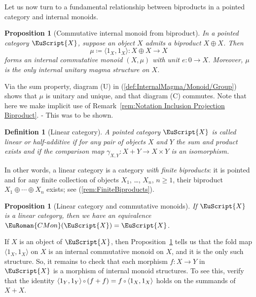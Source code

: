 \documentclass [12pt,oneside]{book}%
\makeatletter
\theoremstyle{captionstyle}  %
\newtheorem{definition}[theorem]{Definition}
\newtheorem{proposition}[theorem]{Proposition}
\renewenvironment{proof}[1][\proofname]{\vspace{-2ex}\par       %
	\pushQED{\qed}%
	\normalfont \topsep6\p@\@plus6\p@\relax
	\trivlist
	\item[\hskip\labelsep
	            \color{proofcaption}\bfseries                %
	            #1\@addpunct{\quad}]\ignorespaces
}{%
	\popQED\endtrivlist\@endpefalse
}
\newcommand{\Defn}[1]{\emph{#1}}
\newcommand{\DefEq}{\coloneq} 		%
\newcommand{\from}{\colon}				%
\newcommand{\Comp}{\raisebox{0.1ex}{\ensuremath{\,\scriptstyle{\circ}}\,}}
\newcommand{\IdMapOn}[1]{1_{#1}}	%
\newcommand{\CMon}{\ensuremath{\EuRoman{CMon}}}
\newcommand{\ZeroObject}{0}                           %
\newcommand{\Ctgry}[1]{\EuScript{#1}}					%
\newcommand{\SACtgry}[1]{\EuScript{#1}}			%
\newcommand{\Prdct}[2]{#1 \times #2}	 	%
\newcommand{\BiPrdct}[2]{#1\oplus #2}
\newcommand{\SumMapOutOf}[1]{\langle #1\rangle}     %
\newcommand{\SumProdComp}[2]{\gamma_{#1,#2}}			%
\makeatother
\begin{document}
Let us now turn to a fundamental relationship between biproducts in a pointed category and internal monoids.

\begin{proposition}[Commutative internal monoid from biproduct]
    \label{thm:CommutativeInternalMonoid-From-BiProduct}
    In a pointed category $\Ctgry{X}$, suppose an object $X$ admits a biproduct $X\oplus X$. Then
    \[
        \mu\DefEq \SumMapOutOf{\IdMapOn{X},\IdMapOn{X}}\from \BiPrdct{X}{X}\to X
    \]
    forms an internal commutative monoid $(X,\mu)$ with unit $e \from \ZeroObject\to X$. Moreover, $\mu$ is the only internal unitary magma structure on $X$.
\end{proposition}
\begin{proof}
    Via the sum property, diagram (U) in (\ref{def:InternalMagma/Monoid/Group}) shows that $\mu$ is unitary and unique, and that diagram (C) commutes. Note that here we make implicit use of Remark~\ref{rem:Notation Inclusion Projection Biproduct}. - This was to be shown.
\end{proof}

\begin{definition}[Linear category]
    \label{def:LinearCategory}
    A pointed category $\SACtgry{X}$ is called \Defn{linear} or \Defn{half-additive} if for any pair of objects $X$ and $Y$ the sum and product exists and if the comparison map $\SumProdComp{X}{Y}\from X+Y\to \Prdct{X}{Y}$ is an isomorphism. %
\end{definition}

In other words, a linear category is a category \emph{with finite biproducts}: it is pointed and for any finite collection of objects $X_1$, \dots, $X_n$, $n\geq 1$, their biproduct $X_1\oplus\cdots \oplus X_n$ exists; see (\ref{rem:FiniteBiproducts}).


\begin{proposition}[Linear category and commutative monoids]\label{thm:LinearThenCMon}
    If $\Ctgry{X}$ is a linear category, then we have an equivalence $\CMon(\Ctgry{X})=\Ctgry{X}$.
\end{proposition}
\begin{proof}
    If $X$ is an object of $\Ctgry{X}$, then Proposition~\ref{thm:CommutativeInternalMonoid-From-BiProduct} tells us that the fold map $\SumMapOutOf{\IdMapOn{X},\IdMapOn{X}}$ on $X$ is an internal commutative monoid on $X$, and it is the only such structure. So, it remains to check that each morphism $f\from X\to Y$ in $\Ctgry{X}$ is a morphism of internal monoid structures. To see this, verify that the identity $\langle1_Y,1_Y\rangle \Comp(f+f)=f\Comp\langle1_X,1_X\rangle$ holds on the summands of $X+X$.
\end{proof}
\end{document}
